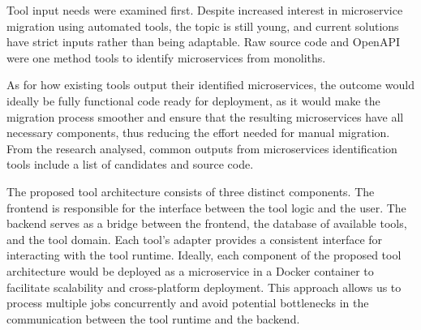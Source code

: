\documentclass[conference]{IEEEtran}
\begin{document}
Tool input needs were examined first. Despite increased interest in
microservice migration using automated tools, the topic is still young, and
current solutions have strict inputs rather than being adaptable. Raw source
code and OpenAPI were one method tools to identify microservices from
monoliths.

As for how existing tools output their identified microservices, the outcome
would ideally be fully functional code ready for deployment, as it would make
the migration process smoother and ensure that the resulting microservices have
all necessary components, thus reducing the effort needed for manual migration.
From the research analysed, common outputs from microservices identification
tools include a list of candidates and source code.

The proposed tool architecture consists of three distinct components. The
frontend is responsible for the interface between the tool logic and the user.
The backend serves as a bridge between the frontend, the database of available
tools, and the tool domain. Each tool's adapter provides a consistent interface
for interacting with the tool runtime. Ideally, each component of the proposed
tool architecture would be deployed as a microservice in a Docker container to
facilitate scalability and cross-platform deployment. This approach allows us
to process multiple jobs concurrently and avoid potential bottlenecks in the
communication between the tool runtime and the backend.



\balance
{}
\end{document}
